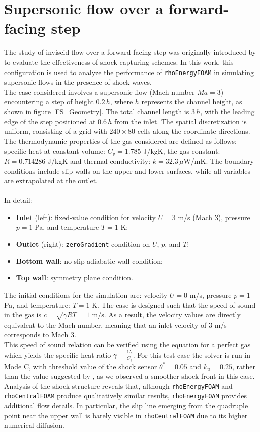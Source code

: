 \documentclass[a5paper]{sapthesis}
\begin{document}
	\section{Supersonic flow over a forward-facing step}
	The study of inviscid flow over a forward-facing step was originally introduced by \citet{EMERY1968306} to evaluate the effectiveness of shock-capturing schemes. In this work, this configuration is used to analyze the performance of \texttt{rhoEnergyFOAM} in simulating supersonic flows in the presence of shock waves.
	\\
	The case considered involves a supersonic flow (Mach number $Ma = 3$) encountering a step of height $0.2\,h$, where $h$ represents the channel height, as shown in figure \ref{FS_Geometry}. The total channel length is $3\,h$, with the leading edge of the step positioned at $0.6\,h$ from the inlet. The spatial discretization is uniform, consisting of a grid with $240 \times 80$ cells along the coordinate directions. 	The thermodynamic properties of the gas considered are defined as follows: specific heat at constant volume: $C_v = 1.785$ J/kgK, the gas constant: $R = 0.714286$ J/kgK and thermal conductivity: $k = 32.3 \,\mu$W/mK. The boundary conditions include slip walls on the upper and lower surfaces, while all variables are extrapolated at the outlet. \\
	\\
	In detail:
	
	\begin{itemize}
		\item \textbf{Inlet} (left): fixed-value condition for velocity $U = 3$ m/s (Mach 3), pressure $p = 1$ Pa, and temperature $T = 1$ K;
		\item \textbf{Outlet} (right): \texttt{zeroGradient} condition on $U$, $p$, and $T$;
		\item \textbf{Bottom wall}: no-slip adiabatic wall condition;
		\item \textbf{Top wall}: symmetry plane condition.
	\end{itemize}

	\noindent The initial conditions for the simulation are: velocity  $U = 0$ m/s, pressure $p = 1$ Pa, and temperature: $T = 1$ K. The case is designed such that the speed of sound in the gas is	$c = \sqrt{\gamma R T} = 1 \text{ m/s}$. As a result, the velocity values are directly equivalent to the Mach number, meaning that an inlet velocity of 3 m/s corresponds to Mach 3.
	\\
	This speed of sound relation can be verified using the equation for a perfect gas which yields the specific heat ratio $\gamma = \frac{C_p}{C_v}$. 
	For this test case the solver is run in Mode C, with threshold
	value of the shock sensor $\theta^* = 0.05$ and $k_u = 0.25$, rather than the value suggested by \citet{LIOU_AUSM+-up}, as we observed a smoother shock front in this case.
	Analysis of the shock structure reveals that, although \texttt{rhoEnergyFOAM} and \texttt{rhoCentralFOAM} produce qualitatively similar results, \texttt{rhoEnergyFOAM} provides additional flow details. In particular, the slip line emerging from the quadruple point near the upper wall is barely visible in \texttt{rhoCentralFOAM} due to its higher numerical diffusion.
			
\end{document}
